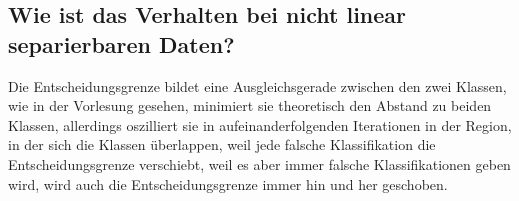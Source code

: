 \subsection{Wie ist das Verhalten bei nicht linear separierbaren Daten?}
Die Entscheidungsgrenze bildet eine Ausgleichsgerade zwischen den zwei Klassen, wie in der Vorlesung gesehen, minimiert sie theoretisch den Abstand zu beiden Klassen, allerdings oszilliert sie in aufeinanderfolgenden Iterationen in der Region, in der sich die Klassen überlappen, weil jede falsche Klassifikation die Entscheidungsgrenze verschiebt, weil es aber immer falsche Klassifikationen geben wird, wird auch die Entscheidungsgrenze immer hin und her geschoben.